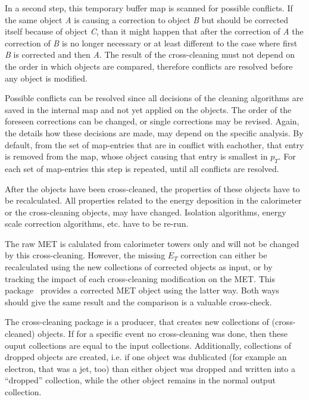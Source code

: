 \documentclass{cmspaper}
\begin{document}
In a second step, this temporary buffer map is scanned for possible conflicts.
If the same object {\it A} is causing a correction to object {\it B} but should
be corrected itself because of object {\it C}, than it might happen that after
the correction of {\it A} the correction of {\it B} is no longer necessary or at
least different to the case where first {\it B} is corrected and then {\it A}.
The result of the cross-cleaning must not depend on the order in which objects
are compared, therefore conflicts are resolved before any object is
modified.

Possible conflicts can be resolved since all decisions of the cleaning
algorithms are saved in the internal map and not yet applied on the objects. The
order of the foreseen corrections can be changed, or single corrections may be
revised. Again, the details how these decisions are made, may depend on the
specific analysis. 
%
By default, from the set of map-entries that are in conflict with eachother,
that entry is removed from the map, whose object causing that entry is smallest
in $p_T$. For each set of map-entries this step is repeated, until all conflicts
are resolved.

After the objects have been cross-cleaned, the properties of these objects have
to be recalculated. All properties related to the energy deposition in the
calorimeter or the cross-cleaning objects, may have changed. Isolation
algorithms, energy scale correction algorithms, etc. have to be re-run.

The raw MET is calulated from calorimeter towers only and will not be changed by
this cross-cleaning. However, the missing $E_T$ correction can either be
recalculated using the new collections of corrected objects as input, or by
tracking the impact of each cross-cleaning modification on the MET. This
package~\cite{package} provides a corrected MET object using the latter way.
Both ways should give the same result and the comparison is a valuable
cross-check. 

The cross-cleaning package is a producer, that creates new collections of
(cross-cleaned) objects. If for a specific event no cross-cleaning was done,
then these ouput collections are equal to the input collections. Additionally,
collections of dropped objects are created, i.e. if one object was dublicated
(for example an electron, that was a jet, too) than either object was dropped
and written into a ``dropped'' collection, while the other object remains in the
normal output collection. 
\end{document}
